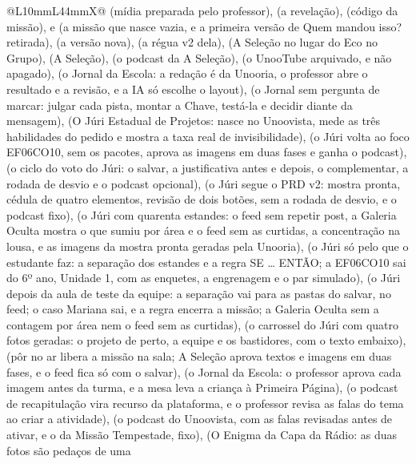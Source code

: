 \begin{tabularx}{\linewidth}{@{}L{10mm}L{44mm}X@{}}
  (mídia preparada pelo professor),  (a revelação),
   (código da missão),  e  (a missão
  que nasce vazia, e a primeira versão de Quem mandou isso? retirada),
   (a versão nova),  (a régua v2 dela),
   (A Seleção no lugar do Eco no Grupo),  (A
  Seleção),  (o podcast da A Seleção),  (o UnooTube
  arquivado, e não apagado),  (o Jornal da Escola: a redação é
  da Unooria, o professor abre o resultado e a revisão, e a IA só escolhe o
  layout),  (o Jornal sem pergunta de marcar: julgar cada pista,
  montar a Chave, testá-la e decidir diante da mensagem),  (O Júri Estadual de Projetos: nasce no Unoovista,
  mede as três habilidades do pedido e mostra a taxa real de invisibilidade),
   (o Júri volta ao foco EF06CO10, sem os pacotes, aprova as
  imagens em duas fases e ganha o podcast),  (o ciclo do voto
  do Júri: o salvar, a justificativa antes e depois, o complementar, a rodada
  de desvio e o podcast opcional),  (o Júri segue o PRD v2:
  mostra pronta, cédula de quatro elementos, revisão de dois botões, sem a
  rodada de desvio, e o podcast fixo),  (o Júri com quarenta
  estandes: o feed sem repetir post, a Galeria Oculta mostra o que sumiu por
  área e o feed sem as curtidas, a concentração na lousa, e as imagens da
  mostra pronta geradas pela Unooria),  (o Júri só pelo que o
  estudante faz: a separação dos estandes e a regra SE \ldots{} ENTÃO; a
  EF06CO10 sai do 6º ano, Unidade 1, com as enquetes, a engrenagem e o par
  simulado),  (o Júri depois da aula de teste da equipe: a
  separação vai para as pastas do salvar, no feed; o caso Mariana sai, e a
  regra encerra a missão; a Galeria Oculta sem a contagem por área nem o feed
  sem as curtidas),  (o carrossel do Júri com quatro fotos
  geradas: o projeto de perto, a equipe e os bastidores, com o texto embaixo),
   (pôr no ar libera a missão na sala; A Seleção aprova textos
  e imagens em duas fases, e o feed fica só com o salvar),  (o
  Jornal da Escola: o professor aprova cada imagem antes da turma, e a mesa
  leva a criança à Primeira Página),  (o podcast de
  recapitulação vira recurso da plataforma, e o professor revisa as falas do
  tema ao criar a atividade),  (o podcast do Unoovista, com as
  falas revisadas antes de ativar, e o da Missão Tempestade, fixo),
   (O Enigma da Capa da Rádio: as duas fotos são pedaços de uma

\end{tabularx}
